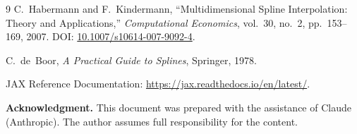 \documentclass[11pt,a4paper]{article}
\begin{document}
\begin{thebibliography}{9}
  C.~Habermann and F.~Kindermann,
  ``Multidimensional Spline Interpolation: Theory and Applications,''
  \emph{Computational Economics}, vol.~30, no.~2, pp.~153--169, 2007.
  DOI: \href{https://doi.org/10.1007/s10614-007-9092-4}{10.1007/s10614-007-9092-4}.

  C.~de~Boor,
  \emph{A Practical Guide to Splines},
  Springer, 1978.

  JAX Reference Documentation:
  \url{https://jax.readthedocs.io/en/latest/}.
\end{thebibliography}

\bigskip
\noindent\textbf{Acknowledgment.}\quad
This document was prepared with the assistance of Claude (Anthropic).
The author assumes full responsibility for the content.
\end{document}
